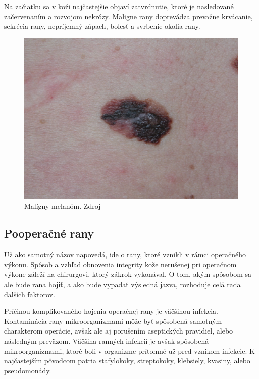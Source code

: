 Na začiatku sa v koži najčastejšie objaví zatvrdnutie, ktoré je nasledované začervenaním a rozvojom nekrózy. Maligne rany doprevádza prevažne krvácanie, sekrécia rany, nepríjemný zápach, bolesť a svrbenie okolia rany.
\begin{figure}[h]
  \centering
  \includegraphics[scale=0.20]{fig/maligna-rana.png}
  \caption{Malígny melanóm. Zdroj \cite{Svehlik2012}}
  \label{fig:maligny-melanom}
\end{figure}

\subsection{Pooperačné rany}
Už ako samotný názov napovedá, ide o rany, ktoré vznikli v rámci operačného výkonu. Spôsob a vzhľad obnovenia integrity kože nerušenej pri operačnom výkone záleží na chirurgovi, ktorý zákrok vykonával. O tom, akým spôsobom sa ale bude rana hojiť, a ako bude vypadať výsledná jazva, rozhoduje celá rada ďalších faktorov.

Príčinou komplikovaného hojenia operačnej rany je väčšinou infekcia. Kontaminácia rany mikroorganizmami môže byť spôsobená samotným charakterom operácie, avšak ale aj porušením aseptických pravidiel, alebo následným preväzom. Väčšina ranných infekcií je avšak spôsobená mikroorganizmami, ktoré boli v organizme prítomné už pred vznikom infekcie. K najčastejším pôvodcom patria stafylokoky, streptokoky, klebsiely, kvasiny, alebo pseudomonády.

